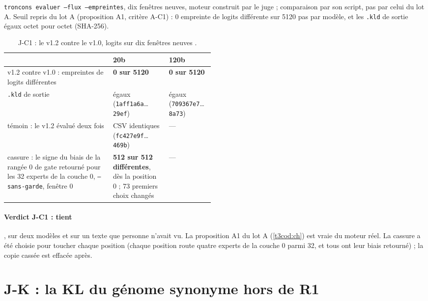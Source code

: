 \texttt{troncons evaluer --flux --empreintes}, dix fenêtres neuves, moteur construit par le juge ; comparaison par son script, pas par celui du lot A. Seuil repris du lot A (proposition A1, critère A-C1) : 0 empreinte de logits différente sur \num{5120} pas par modèle, et les \texttt{.kld} de sortie égaux octet pour octet (SHA-256).

\begin{table}[ht]
\centering\footnotesize
\caption[J-C1 : les logits au bit sur les fenêtres neuves]{J-C1 : le v1.2 contre le v1.0, logits sur dix fenêtres neuves \mes.}
\label{t3jug:tab:jc1}
\begin{tabularx}{\linewidth}{@{}>{\raggedright\arraybackslash}X>{\raggedright\arraybackslash}p{0.27\linewidth}>{\raggedright\arraybackslash}p{0.22\linewidth}@{}}
\toprule
& 20b & 120b \\
\midrule
v1.2 contre v1.0 : empreintes de logits différentes & \textbf{0 sur \num{5120}} & \textbf{0 sur \num{5120}} \\
\texttt{.kld} de sortie & égaux (\texttt{1aff1a6a}…\texttt{29ef}) & égaux (\texttt{709367e7}…\texttt{8a73}) \\
témoin : le v1.2 évalué deux fois & CSV identiques (\texttt{fc427e9f}…\texttt{469b}) & --- \\
cassure : le signe du biais de la rangée 0 de gate retourné pour les 32 experts de la couche 0, \texttt{--sans-garde}, fenêtre 0 & \textbf{512 sur 512 différentes}, dès la position 0 ; 73 premiers choix changés & --- \\
\bottomrule
\end{tabularx}
\end{table}

\paragraph{Verdict J-C1 : tient}, sur deux modèles et sur un texte que personne n'avait vu. La proposition A1 du lot A (\cref{t3cod:ch}) est vraie du moteur réel. La cassure a été choisie pour toucher chaque position (chaque position route quatre experts de la couche 0 parmi 32, et tous ont leur biais retourné) ; la copie cassée est effacée après.

\section{J-K : la KL du génome synonyme hors de R1}\label{t3jug:sec:kl}

